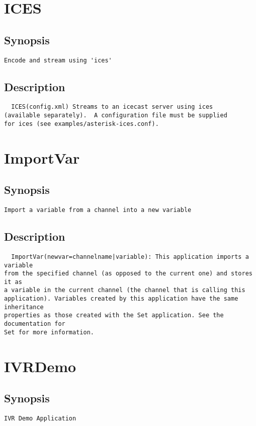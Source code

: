 \section{ICES}
\subsection{Synopsis}
\begin{verbatim}
Encode and stream using 'ices'
\end{verbatim}
\subsection{Description}
\begin{verbatim}
  ICES(config.xml) Streams to an icecast server using ices
(available separately).  A configuration file must be supplied
for ices (see examples/asterisk-ices.conf). 

\end{verbatim}


\section{ImportVar}
\subsection{Synopsis}
\begin{verbatim}
Import a variable from a channel into a new variable
\end{verbatim}
\subsection{Description}
\begin{verbatim}
  ImportVar(newvar=channelname|variable): This application imports a variable
from the specified channel (as opposed to the current one) and stores it as
a variable in the current channel (the channel that is calling this
application). Variables created by this application have the same inheritance
properties as those created with the Set application. See the documentation for
Set for more information.

\end{verbatim}


\section{IVRDemo}
\subsection{Synopsis}
\begin{verbatim}
IVR Demo Application
\end{verbatim}
